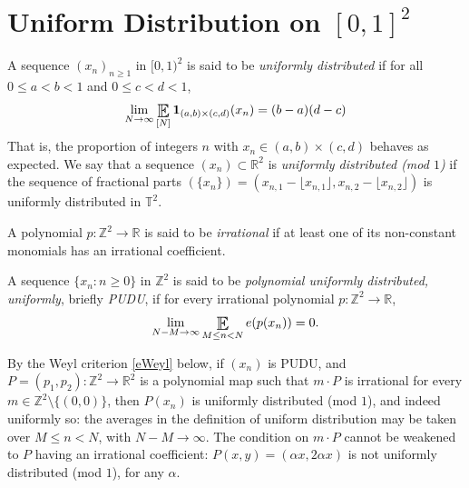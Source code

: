 
 
\section{Uniform Distribution on \texorpdfstring{$[0,1]^2$}{[0,1]²}}%
\label{sec:uniformDistributionMod1}

\begin{definition} A sequence $(x_n)_{n \geq 1}$ in $[0,1) ^2 $ is said to be \emph{uniformly distributed} if for all $0\leq a < b < 1$ and $0\leq c<d<1$, 
\begin{equation}
    \lim_{N\to \infty} \Expectation _{[N]}  \mathbf{1}_{ (a,b) \times (c,d)} (x_n) = (b-a)(d-c) 
\end{equation}
That is, the proportion of integers $n$ with $x_n \in (a,b) \times (c,d)$ behaves as expected.  We say that a sequence $(x_n) \subset \mathbb{R} ^2 $  is \textit{uniformly distributed (mod $1$)} if the sequence of fractional parts $(\{ x_n \}) = ( x_{n,1} - \lfloor x_{n,1} \rfloor,  x_{n,2} - \lfloor x_{n,2} \rfloor )$ is uniformly distributed in $\mathbb{T}  ^2 $.      
\end{definition}




A polynomial $p\colon\mathbb{Z}^2\to\mathbb{R}$ is said to be \emph{irrational} if at least one of its non-constant monomials has an irrational coefficient.  

\begin{definition} A sequence $\{x_n \colon n \geq 0\}$ in $ \mathbb{Z} ^2  $ is said to be \emph{polynomial uniformly distributed, uniformly}, briefly \emph{PUDU}, if 
for every irrational polynomial $p\colon\mathbb{Z}^2\to\mathbb{R}$, 
\begin{equation}\label{e:PUDU}
    \lim_{N-M\to \infty} \Expectation _{M\leq n<N}    e( p (x_n))  = 0. 
\end{equation}
\end{definition}

By the Weyl criterion \eqref{eWeyl} below, if $(x_n)$ is PUDU, and $P=(p_1,p_2)\colon\mathbb{Z}^2\to\mathbb{R}^2$ is a polynomial map such that 
$m\cdot P$ is irrational for every $m\in\mathbb{Z}^2\setminus\{(0,0)\}$, then $P(x_n)$ is uniformly distributed (mod $1$), and indeed uniformly so: 
the averages in the definition of uniform distribution may be taken over $M\leq n<N$, with $N-M\to\infty$. 
The condition on $m\cdot P$ cannot be weakened to $P$ having an irrational coefficient: 
$P(x,y)=(\alpha x,2\alpha x)$ is not uniformly distributed (mod $1$), for any $\alpha$.



